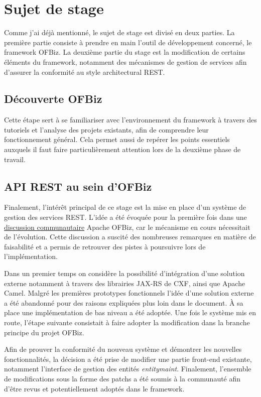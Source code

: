 \section{Sujet de stage }
Comme j'ai déjà mentionné, le sujet de stage est divisé en deux parties. La première partie consiste à prendre en main l'outil de développement concerné, le framework OFBiz. La deuxième partie du stage est la modification de certains éléments du framework, notamment des mécanismes de gestion de services afin d'assurer la conformité au style architectural REST.  

\subsection{Découverte OFBiz}
Cette étape sert à se familiariser avec l'environnement du framework à travers des tutoriels et l'analyse des projets existants, afin de comprendre leur fonctionnement général. Cela permet aussi de repérer les points essentiels auxquels il faut faire particulièrement attention lors de la deuxième phase de travail. 

\subsection{API REST au sein d'OFBiz}

Finalement, l'intérêt principal de ce stage est la mise en place d'un système de gestion des services REST. L'idée a été évoquée pour la première fois dans une \href{https://issues.apache.org/jira/browse/OFBIZ-4274}{discussion communautaire} Apache OFBiz, car le mécanisme en cours nécessitait de l'évolution. Cette discussion a suscité des nombreuses remarques en matière de faisabilité et a permis de retrouver des pistes à poursuivre lors de l'implémentation.  

Dans un premier temps on considère la possibilité d'intégration d'une solution externe notamment à travers des librairies JAX-RS de CXF, ainsi que Apache Camel. Malgré les premières prototypes fonctionnels l'idée d'une solution externe a été abandonné pour des raisons expliquées plus loin dans le document. À sa place une implémentation de bas niveau a été adoptée. Une fois le système mis en route, l'étape suivante consistait à faire adopter la modification dans la branche principe du projet OFBiz. 

Afin de prouver la conformité du nouveau système et démontrer les nouvelles fonctionnalités, la décision a été prise de modifier une partie front-end existante, notamment l'interface de gestion des entités \emph{entitymaint}. Finalement, l'ensemble de modifications sous la forme des patchs a été soumis à la communauté afin d'être revus et potentiellement adoptés dans le framework. 









